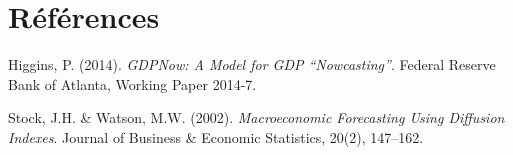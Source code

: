 \documentclass[11pt,a4paper]{article}
\begin{document}
\section*{Références}
\begin{enumerate}[leftmargin=1.6em, label=\textbf{[\arabic*]}]
\item \hypertarget{ref1}{} Higgins, P. (2014). \textit{GDPNow: A Model for GDP ``Nowcasting''}. Federal Reserve Bank of Atlanta, Working Paper 2014-7.
\item \hypertarget{ref2}{} Stock, J.H. \& Watson, M.W. (2002). \textit{Macroeconomic Forecasting Using Diffusion Indexes}. Journal of Business \& Economic Statistics, 20(2), 147--162.
\end{enumerate}
\end{document}
